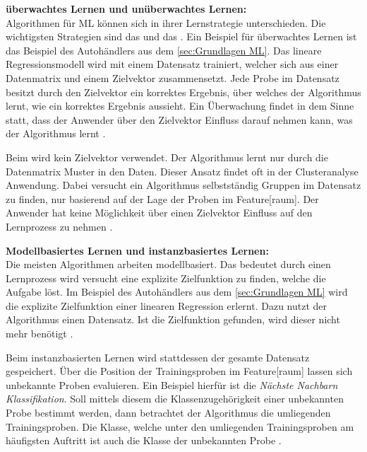 \textbf{\Gls{überwachtes Lernen} und \gls{unüberwachtes Lernen}:}\\
Algorithmen für \gls{ML} können sich in ihrer Lernstrategie unterschieden. Die wichtigsten Strategien sind das  und das . Ein Beispiel für \gls{überwachtes Lernen} ist das Beispiel des Autohändlers aus dem \autoref{sec:Grundlagen ML}. Das lineare Regressionsmodell wird mit einem Datensatz trainiert, welcher sich aus einer \gls{Datenmatrix} und einem \gls{Zielvektor} zusammensetzt. Jede Probe im Datensatz besitzt durch den \gls{Zielvektor} ein korrektes Ergebnis, über welches der Algorithmus lernt, wie ein korrektes Ergebnis aussieht. Ein Überwachung findet in dem Sinne statt, dass der Anwender über den \gls{Zielvektor} Einfluss darauf nehmen kann, was der Algorithmus lernt \cite{Burkov.2019, Goodfellow.2016}.\par

Beim  wird kein \gls{Zielvektor} verwendet. Der Algorithmus lernt nur durch die \gls{Datenmatrix} Muster in den Daten. Dieser Ansatz findet oft in der Clusteranalyse Anwendung. Dabei versucht ein Algorithmus selbstständig Gruppen im Datensatz zu finden, nur basierend auf der Lage der Proben im \gls{Feature}[raum]. Der Anwender hat keine Möglichkeit über einen \gls{Zielvektor} Einfluss auf den Lernprozess zu nehmen \cite{Burkov.2019, Goodfellow.2016}. \dubpar

\textbf{Modellbasiertes Lernen und instanzbasiertes Lernen:}\\
Die meisten Algorithmen arbeiten modellbasiert. Das bedeutet durch einen Lernprozess wird versucht eine explizite \gls{Zielfunktion} zu finden, welche die Aufgabe löst. Im Beispiel des Autohändlers aus dem \autoref{sec:Grundlagen ML} wird die explizite \gls{Zielfunktion} einer linearen Regression erlernt. Dazu nutzt der Algorithmus einen Datensatz. Ist die \gls{Zielfunktion} gefunden, wird dieser nicht mehr benötigt \cite{Burkov.2019}.\par

Beim instanzbasierten Lernen wird stattdessen der gesamte Datensatz gespeichert. Über die Position der Trainingsproben im \gls{Feature}[raum] lassen sich unbekannte Proben evaluieren. Ein Beispiel hierfür ist die \textit{Nächste Nachbarn Klassifikation}. Soll mittels diesem  die Klassenzugehörigkeit einer unbekannten Probe bestimmt werden, dann betrachtet der Algorithmus die umliegenden Trainingsproben. Die Klasse, welche unter den umliegenden  Trainingsproben am häufigsten Auftritt ist auch die Klasse der unbekannten Probe \cite{Burkov.2019, Mitchell.1997}.\dubpar


